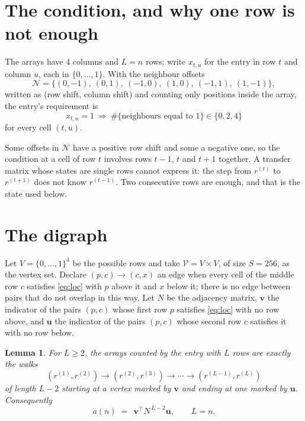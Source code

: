 \documentclass[11pt,a4paper]{article}
\theoremstyle{plain}
\newtheorem{lemma}[theorem]{Lemma}
\theoremstyle{definition}
\begin{document}
\section{The condition, and why one row is not enough}

The arrays have $4$ columns and $L=n$ rows; write $x_{t,u}$ for the entry in
row $t$ and column $u$, each in $\{0,\dots,1\}$. With the neighbour offsets
\[
\mathcal N=\{(0,-1),\ (0,1),\ (-1,0),\ (1,0),\ (-1,1),\ (1,-1)\},
\]
written as (row shift, column shift) and counting only positions inside the array, the
entry's requirement is
\begin{equation}\label{eq:loc}
x_{t,u}=1\ \Rightarrow\ \#\{\text{neighbours equal to }1\}\in\{0,2,4\}
\end{equation}
for every cell $(t,u)$.

Some offsets in $\mathcal N$ have a positive row shift and some a negative one, so the
condition at a cell of row $t$ involves rows $t-1$, $t$ and $t+1$ together. A transfer
matrix whose states are single rows cannot express it: the step from $r^{(t)}$ to
$r^{(t+1)}$ does not know $r^{(t-1)}$. Two consecutive rows are enough, and that is
the state used below.

\section{The digraph}

Let $V=\{0,\dots,1\}^{4}$ be the possible rows and take
$\mathcal V=V\times V$, of size $S=256$, as the vertex set. Declare $(p,c)\to(c,x)$ an edge
when every cell of the middle row $c$ satisfies \eqref{eq:loc} with $p$ above it and $x$
below it; there is no edge between pairs that do not overlap in this way. Let $N$ be the
adjacency matrix, $\mathbf{v}$ the indicator of the pairs $(p,c)$ whose first row $p$
satisfies \eqref{eq:loc} with no row above, and $\mathbf{u}$ the indicator of
the pairs $(p,c)$ whose second row $c$ satisfies it with no row below.

\begin{lemma}\label{lem:walk}
For $L\ge2$, the arrays counted by the entry with $L$ rows are exactly the walks
\[
(r^{(1)},r^{(2)})\to(r^{(2)},r^{(3)})\to\cdots\to(r^{(L-1)},r^{(L)})
\]
of length $L-2$ starting at a vertex marked by $\mathbf{v}$ and ending at one marked by
$\mathbf{u}$. Consequently
\[
a(n)\;=\;\,\mathbf{v}^{\!\top}N^{\,L-2}\mathbf{u},\qquad L=n .
\]
\end{lemma}
\end{document}
